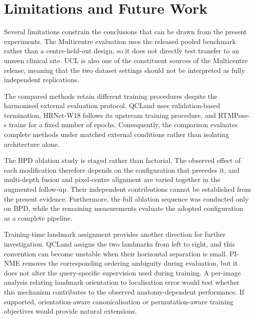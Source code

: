 
\section{Limitations and Future Work}
\label{sec:conclusion-future}

Several limitations constrain the conclusions that can be drawn from
the present experiments. The Multicentre evaluation uses the released
pooled benchmark rather than a centre-held-out design, so it does not
directly test transfer to an unseen clinical site. UCL is also one of
the constituent sources of the Multicentre release, meaning that the
two dataset settings should not be interpreted as fully independent
replications.

The compared methods retain different training procedures despite the
harmonised external evaluation protocol. QCLand uses
validation-based termination, HRNet-W18 follows its upstream training
procedure, and RTMPose-s trains for a fixed number of epochs.
Consequently, the comparison evaluates complete methods under matched
external conditions rather than isolating architecture alone.

The BPD ablation study is staged rather than factorial. The observed
effect of each modification therefore depends on the configuration
that precedes it, and multi-depth fusion and pixel-centre alignment
are varied together in the augmented follow-up. Their independent
contributions cannot be established from the present evidence.
Furthermore, the full ablation sequence was conducted only on BPD,
while the remaining measurements evaluate the adopted configuration
as a complete pipeline.

Training-time landmark assignment provides another direction for
further investigation. QCLand assigns the two landmarks from left to
right, and this convention can become unstable when their horizontal
separation is small. PI-NME removes the corresponding ordering
ambiguity during evaluation, but it does not alter the query-specific
supervision used during training. A per-image analysis relating
landmark orientation to localisation error would test whether this
mechanism contributes to the observed anatomy-dependent performance.
If supported, orientation-aware canonicalisation or
permutation-aware training objectives would provide natural
extensions.

